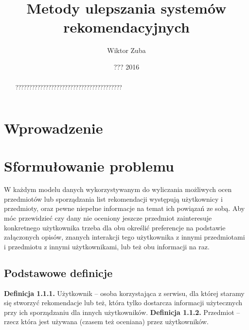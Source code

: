 \documentclass{pracamgr}
\author{Wiktor Zuba}
\title{Metody ulepszania systemów rekomendacyjnych}
\date{??? 2016}
\begin{document}
\maketitle

\begin{abstract}
???????????????????????????????????????
\end{abstract}


\tableofcontents

\chapter*{Wprowadzenie}


 \chapter{Sformułowanie problemu}
  W każdym modelu danych wykorzystywanym do wyliczania możliwych ocen przedmiotów lub sporządzania list rekomendacji
  występują użytkownicy i przedmioty, oraz pewne niepełne informacje na temat ich powiązań ze sobą.
  Aby móc przewidzieć czy dany nie oceniony jeszcze przedmiot zainteresuje konkretnego użytkownika trzeba dla obu określić preferencje na podstawie 
  załączonych opisów, znanych interakcji tego użytkownika z innymi przedmiotami i przedmiotu z innymi użytkownikami, lub też obu informacji na raz.
  
  
  \section{Podstawowe definicje}
   \textbf{Definicja 1.1.1.} Użytkownik -- osoba korzystająca z serwisu, dla której staramy się stworzyć rekomendacje lub też,
    która tylko dostarcza informacji użytecznych przy ich sporządzaniu dla innych użytkowników.\newline\newline
   \textbf{Definicja 1.1.2.} Przedmiot -- rzecz która jest używana (czasem też oceniana) przez użytkowników.\newline
   
\end{document}
